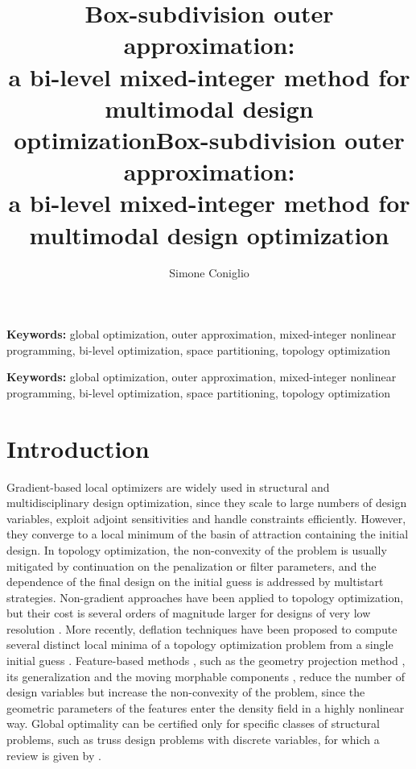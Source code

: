 \documentclass[pdflatex,sn-basic]{sn-jnl}
\newcommand{\keywords}[1]{\par\medskip\noindent\textbf{Keywords:} #1}
\newcommand{\todo}[1]{\textcolor{red}{[TODO: #1]}}
\begin{document}
\ifsnjnl
  \title[Box-subdivision outer approximation]{Box-subdivision outer approximation:\\a bi-level mixed-integer method for multimodal design optimization}
  \author*[1]{ }\email{\todo{e-mail}}
  \affil*[1]{\orgname{\todo{affiliation}}, \orgaddress{\city{\todo{city}}, \country{\todo{country}}}}
  \abstract{}
  \keywords{global optimization, outer approximation, mixed-integer nonlinear programming, bi-level optimization, space partitioning, topology optimization}
  \maketitle
\else
  \title{Box-subdivision outer approximation:\\a bi-level mixed-integer method for multimodal design optimization}
  \author[1]{Simone Coniglio}
  \affil[1]{\todo{affiliation, city, country; e-mail}}
  \date{}
  \maketitle
  \begin{abstract}
  
  \end{abstract}
  \keywords{global optimization, outer approximation, mixed-integer nonlinear programming, bi-level optimization, space partitioning, topology optimization}
\fi

\section{Introduction}\label{sec:intro}

Gradient-based local optimizers are widely used in structural and
multidisciplinary design optimization, since they scale to large numbers of
design variables, exploit adjoint sensitivities and handle constraints
efficiently. However, they converge to a local minimum of the basin of
attraction containing the initial design. In topology optimization, the
non-convexity of the problem is usually mitigated by continuation on the
penalization or filter parameters, and the dependence of the final design on the
initial guess is addressed by multistart strategies. Non-gradient approaches
have been applied to topology optimization, but their cost is several orders of
magnitude larger for designs of very low resolution \citep{sigmund2011}. More
recently, deflation techniques have been proposed to compute several distinct
local minima of a topology optimization problem from a single initial guess
\citep{papadopoulos2021}. Feature-based methods \citep{wein2020}, such as the
geometry projection method \citep{norato2015}, its generalization
\citep{coniglio2020} and the moving morphable components \citep{guo2014}, reduce
the number of design variables
but increase the non-convexity of the problem, since the geometric parameters of
the features enter the density field in a highly nonlinear way. Global
optimality can be certified only for specific classes of structural problems,
such as truss design problems with discrete variables, for which a review is
given by \citet{stolpe2016}.
\end{document}
